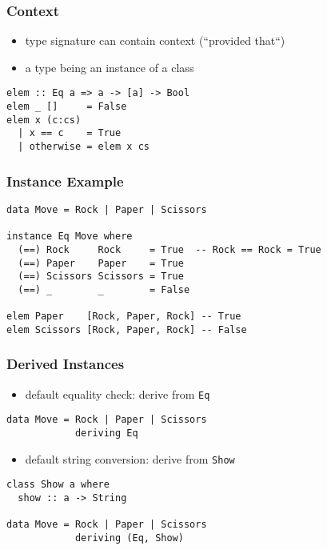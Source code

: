 \documentclass[dvipsnames]{beamer}
\theoremstyle{plain}
\begin{document}
\begin{frame}[fragile]
  \frametitle{Context}

  \begin{itemize}
    \item type signature can contain context (``provided that``)
    \item a type being an instance of a class
  \end{itemize}

  \begin{exampleblock}{}
    \begin{lstlisting}
elem :: Eq a => a -> [a] -> Bool
elem _ []     = False
elem x (c:cs)
  | x == c    = True
  | otherwise = elem x cs
    \end{lstlisting}
  \end{exampleblock}
\end{frame}

\begin{frame}[fragile]
  \frametitle{Instance Example}

  \begin{lstlisting}
data Move = Rock | Paper | Scissors

instance Eq Move where
  (==) Rock     Rock     = True  -- Rock == Rock = True
  (==) Paper    Paper    = True
  (==) Scissors Scissors = True
  (==) _        _        = False

elem Paper    [Rock, Paper, Rock] -- True
elem Scissors [Rock, Paper, Rock] -- False
  \end{lstlisting}
\end{frame}

\begin{frame}[fragile]
  \frametitle{Derived Instances}

  \begin{itemize}
    \item default equality check: derive from \lstinline|Eq|
  \end{itemize}

  \begin{exampleblock}{}
    \begin{lstlisting}
data Move = Rock | Paper | Scissors
            deriving Eq
    \end{lstlisting}
  \end{exampleblock}

  \pause
  \begin{itemize}
    \item default string conversion: derive from \lstinline|Show|
  \end{itemize}

  \begin{exampleblock}{}
    \begin{lstlisting}
class Show a where
  show :: a -> String

data Move = Rock | Paper | Scissors
            deriving (Eq, Show)
   \end{lstlisting}
  \end{exampleblock}
\end{frame}
\end{document}
